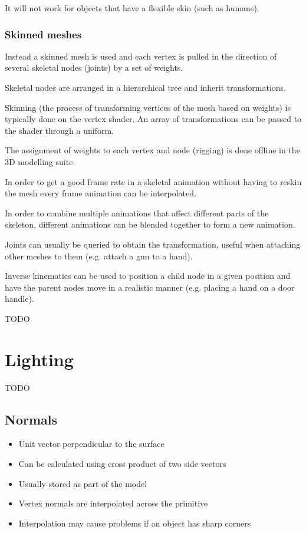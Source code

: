 \documentclass[a4paper]{article}
\begin{document}
It will not work for objects that have a flexible skin (such as humans).

\subsubsection{Skinned meshes}

Instead a skinned mesh is used and each vertex is pulled in the direction of
several skeletal nodes (joints) by a set of weights.

Skeletal nodes are arranged in a hierarchical tree and inherit transformations.

Skinning (the process of transforming vertices of the mesh based on weights) is
typically done on the vertex shader. An array of transformations can be passed
to the shader through a uniform.

The assignment of weights to each vertex and node (rigging) is done offline in
the 3D modelling suite.

In order to get a good frame rate in a skeletal animation without having to
reskin the mesh every frame animation can be interpolated.

In order to combine multiple animations that affect different parts of the
skeleton, different animations can be blended together to form a new animation.

Joints can usually be queried to obtain the transformation, useful when
attaching other meshes to them (e.g. attach a gun to a hand).

Inverse kinematics can be used to position a child node in a given position and
have the parent nodes move in a realistic manner (e.g. placing a hand on a door
handle).

TODO

\section{Lighting}

TODO

\subsection{Normals}

\begin{itemize}
  \item
    Unit vector perpendicular to the surface

  \item
    Can be calculated using cross product of two side vectors

  \item
    Usually stored as part of the model

  \item
    Vertex normals are interpolated across the primitive

  \item
    Interpolation may cause problems if an object has sharp corners

\end{itemize}
\end{document}
